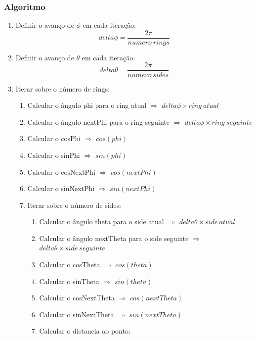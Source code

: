 \documentclass[a4paper]{article}
\begin{document}
 \subsubsection{Algoritmo}
 
 \ttfamily
\begin{enumerate}
  \item Definir o avanço de $\phi$ em cada iteração: $$delta\phi = \frac{2\pi}{numero\ rings} $$
  \item Definir o avanço de $\theta$ em cada iteração: $$delta\theta = \frac{2\pi}{numero\ sides} $$
  \item Iterar sobre o número de rings:
  \begin{enumerate}
    \item Calcular o ângulo phi para o ring atual $\Rightarrow$ \underline{$delta\phi \times ring\ atual$}
    \item Calcular o ângulo nextPhi para o ring seguinte $\Rightarrow$ \underline{$delta\phi \times ring\ seguinte$}
    \item Calcular o cosPhi $\Rightarrow$ \underline{$cos(phi)$}
    \item Calcular o sinPhi $\Rightarrow$ \underline{$sin(phi)$}
    \item Calcular o cosNextPhi $\Rightarrow$ \underline{$cos(nextPhi)$}
    \item Calcular o sinNextPhi $\Rightarrow$ \underline{$sin(nextPhi)$}

    \item Iterar sobre o número de sides:
    \begin{enumerate}
      \item Calcular o ângulo theta para o side atual $\Rightarrow$ \underline{$delta\theta \times side\ atual$}
      \item Calcular o ângulo nextTheta para o side seguinte $\Rightarrow$ \underline{$delta\theta \times side\ seguinte$}
      \item Calcular o cosTheta $\Rightarrow$ \underline{$cos(theta)$}
      \item Calcular o sinTheta $\Rightarrow$ \underline{$sin(theta)$}
      \item Calcular o cosNextTheta $\Rightarrow$ \underline{$cos(nextTheta)$}
      \item Calcular o sinNextTheta $\Rightarrow$ \underline{$sin(nextTheta)$}
      \item Calcular o distancia ao ponto:
       \hspace{0.5cm} 
       

\end{enumerate}
\end{enumerate}
\end{enumerate}
\end{document}
